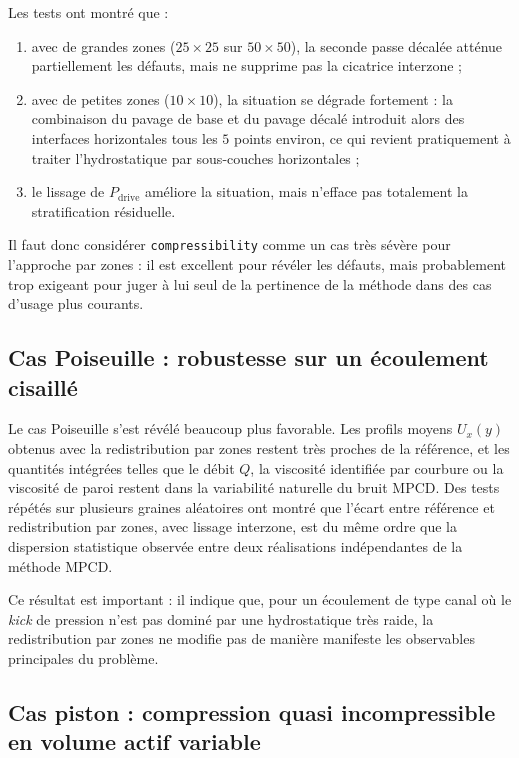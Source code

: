 \documentclass[11pt,a4paper]{article}
\begin{document}
Les tests ont montré que :
\begin{enumerate}[label=\alph*)]
  \item avec de grandes zones ($25\times25$ sur $50\times50$), la seconde passe décalée atténue partiellement les défauts, mais ne supprime pas la cicatrice interzone ;
  \item avec de petites zones ($10\times10$), la situation se dégrade fortement : la combinaison du pavage de base et du pavage décalé introduit alors des interfaces horizontales tous les $5$ points environ, ce qui revient pratiquement à traiter l'hydrostatique par sous-couches horizontales ;
  \item le lissage de $P_{\mathrm{drive}}$ améliore la situation, mais n'efface pas totalement la stratification résiduelle.
\end{enumerate}
Il faut donc considérer \texttt{compressibility} comme un cas très sévère pour l'approche par zones : il est excellent pour révéler les défauts, mais probablement trop exigeant pour juger à lui seul de la pertinence de la méthode dans des cas d'usage plus courants.

\subsection{Cas Poiseuille : robustesse sur un écoulement cisaillé}

Le cas Poiseuille s'est révélé beaucoup plus favorable. Les profils moyens $U_x(y)$ obtenus avec la redistribution par zones restent très proches de la référence, et les quantités intégrées telles que le débit $Q$, la viscosité identifiée par courbure ou la viscosité de paroi restent dans la variabilité naturelle du bruit MPCD. Des tests répétés sur plusieurs graines aléatoires ont montré que l'écart entre référence et redistribution par zones, avec lissage interzone, est du même ordre que la dispersion statistique observée entre deux réalisations indépendantes de la méthode MPCD.

Ce résultat est important : il indique que, pour un écoulement de type canal où le \emph{kick} de pression n'est pas dominé par une hydrostatique très raide, la redistribution par zones ne modifie pas de manière manifeste les observables principales du problème.

\subsection{Cas piston : compression quasi incompressible en volume actif variable}
\end{document}
